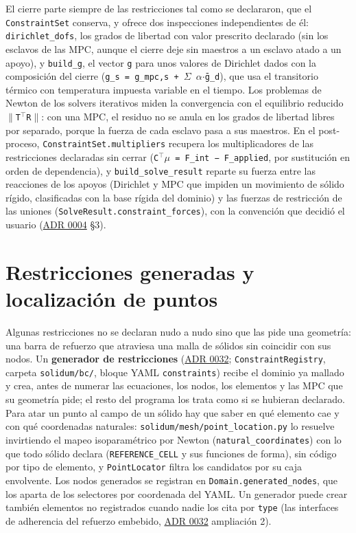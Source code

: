 \documentclass[11pt,oneside]{report}
\begin{document}
El cierre parte siempre de las restricciones tal como se declararon, que el \texttt{ConstraintSet} conserva, y ofrece dos inspecciones independientes de él: \texttt{dirichlet\_dofs}, los grados de libertad con valor prescrito declarado (sin los esclavos de las MPC, aunque el cierre deje sin maestros a un esclavo atado a un apoyo), y \texttt{build\_g}, el vector \texttt{g} para unos valores de Dirichlet dados con la composición del cierre (\texttt{g\_\allowbreak{}s = g\_\allowbreak{}mpc,s + \ensuremath{\Sigma} \ensuremath{\alpha}\ensuremath{\cdot}ḡ\_\allowbreak{}d}), que usa el transitorio térmico con temperatura impuesta variable en el tiempo. Los problemas de Newton de los solvers iterativos miden la convergencia con el equilibrio reducido \texttt{\ensuremath{\|}T\ensuremath{^{\top}}R\ensuremath{\|}}: con una MPC, el residuo no se anula en los grados de libertad libres por separado, porque la fuerza de cada esclavo pasa a sus maestros. En el post-proceso, \texttt{ConstraintSet.\allowbreak{}multipliers} recupera los multiplicadores de las restricciones declaradas sin cerrar (\texttt{C\ensuremath{^{\top}}\ensuremath{\mu} = F\_\allowbreak{}int − F\_\allowbreak{}applied}, por sustitución en orden de dependencia), y \texttt{build\_\allowbreak{}solve\_\allowbreak{}result} reparte su fuerza entre las reacciones de los apoyos (Dirichlet y MPC que impiden un movimiento de sólido rígido, clasificadas con la base rígida del dominio) y las fuerzas de restricción de las uniones (\texttt{SolveResult.\allowbreak{}constraint\_\allowbreak{}forces}), con la convención que decidió el usuario (\hyperref[adr:0004]{ADR 0004} §3).

\section{Restricciones generadas y localización de puntos}

Algunas restricciones no se declaran nudo a nudo sino que las pide una geometría: una barra de refuerzo que atraviesa una malla de sólidos sin coincidir con sus nodos. Un \textbf{generador de restricciones} (\hyperref[adr:0032]{ADR 0032}; \texttt{ConstraintRegistry}, carpeta \texttt{solidum/bc/}, bloque YAML \texttt{constraints}) recibe el dominio ya mallado y crea, antes de numerar las ecuaciones, los nodos, los elementos y las MPC que su geometría pide; el resto del programa los trata como si se hubieran declarado. Para atar un punto al campo de un sólido hay que saber en qué elemento cae y con qué coordenadas naturales: \texttt{solidum/\allowbreak{}mesh/\allowbreak{}point\_\allowbreak{}location.\allowbreak{}py} lo resuelve invirtiendo el mapeo isoparamétrico por Newton (\texttt{natural\_\allowbreak{}coordinates}) con lo que todo sólido declara (\texttt{REFERENCE\_CELL} y sus funciones de forma), sin código por tipo de elemento, y \texttt{PointLocator} filtra los candidatos por su caja envolvente. Los nodos generados se registran en \texttt{Domain.\allowbreak{}generated\_\allowbreak{}nodes}, que los aparta de los selectores por coordenada del YAML. Un generador puede crear también elementos no registrados cuando nadie los cita por \texttt{type} (las interfaces de adherencia del refuerzo embebido, \hyperref[adr:0032]{ADR 0032} ampliación 2).
\end{document}
